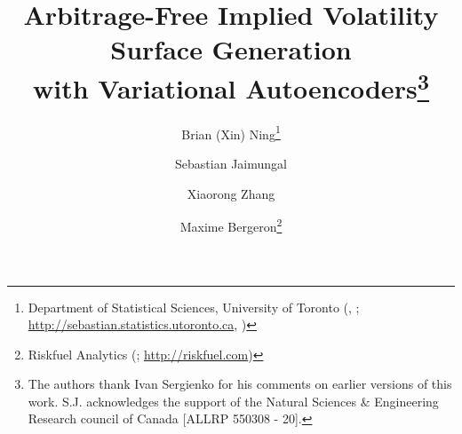 

\usepackage{graphicx}
\usepackage{epstopdf}
\usepackage{dsfont}
\usepackage{amssymb, amsmath,amsfonts}
\usepackage{bm}
\usepackage{bbm}
\usepackage{tikz}
\usepackage{caption}
\usepackage{subcaption}
\usepackage{wrapfig}
\usepackage{tikz}
\usepackage{multirow}
\usetikzlibrary{shapes.geometric, arrows, positioning}
\usepackage{graphicx}%
\usepackage{soul}
\usepackage{threeparttable}
\usepackage[algo2e,ruled,vlined,linesnumbered]{algorithm2e}

\usepackage{booktabs}

\usepackage[colorinlistoftodos]{todonotes}

\ifpdf
\else
\fi

\usepackage{enumitem}

\newcommand{\creflastconjunction}{, and~}



\title{Arbitrage-Free Implied Volatility Surface Generation\\ with Variational Autoencoders\thanks{The authors thank Ivan Sergienko for his comments on earlier versions of this work. S.J. acknowledges the support of the Natural Sciences \& Engineering Research council of Canada [ALLRP 550308 - 20].}
}


\author{Brian (Xin) Ning\thanks{Department of Statistical Sciences, University of Toronto (,
; \url{http://sebastian.statistics.utoronto.ca},
)}\and Sebastian Jaimungal\footnotemark[2]
\and Xiaorong Zhang\footnotemark[2]\and Maxime Bergeron\thanks{Riskfuel Analytics (; \url{http://riskfuel.com})}
}

